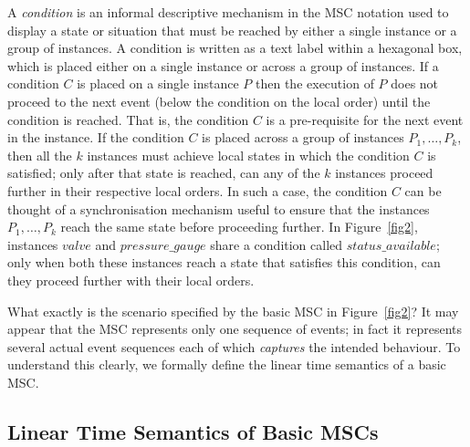 \documentclass{entcs}
\begin{document}
A {\em condition} is an informal descriptive 
mechanism in the MSC notation used to display a state 
or situation that must be reached by either a single 
instance or a group of instances. A condition is 
written as a text label within a hexagonal box, which 
is placed either on a single instance or across a 
group of instances. If a condition $C$ is placed on 
a single instance $P$ then the execution of $P$ does 
not proceed to the next event (below the condition 
on the local order) until the condition is reached. 
That is, the condition $C$ is a pre-requisite for 
the next event in the instance. If the condition 
$C$ is placed across a group of instances 
$P_1,\ldots,P_k$, then all the $k$ instances must 
achieve local states in which the condition $C$ 
is satisfied; only after that state is reached, 
can any of the $k$ instances proceed further in 
their respective local orders. In such a case, 
the condition $C$ can be thought of a 
synchronisation mechanism useful to ensure that 
the instances $P_1,\ldots,P_k$ reach the same state 
before proceeding further. In Figure~\ref{fig2}, instances 
$valve$ and $pressure\_gauge$ share a condition 
called $status\_available$; only when 
both these instances reach a state that satisfies 
this condition, can they proceed further with 
their local orders.

What exactly is the scenario specified by the 
basic MSC in Figure~\ref{fig2}? It may appear that the 
MSC represents only one sequence of events; in fact 
it represents several actual event sequences each 
of which {\em captures} the intended behaviour. 
To understand this clearly, we formally define 
the linear time semantics of a basic MSC.

\subsection{Linear Time Semantics of Basic MSCs}
\end{document}
